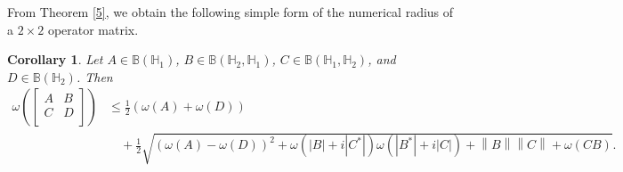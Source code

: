 \documentclass[12pt,twoside,reqno]{amsart}
\newtheorem{corollary}{Corollary}[section]
\numberwithin{equation}{section}
\begin{document}
From Theorem \ref{5}, we obtain the following simple form of the numerical radius of a $2\times 2$ operator matrix.
\begin{corollary}\label{Cor_1}
Let $A\in \mathbb B\left( {{\mathbb H}_{1}} \right)$, $B\in \mathbb B\left( {{\mathbb H}_{2}},{{\mathbb H}_{1}} \right)$, $C\in \mathbb B\left( {{\mathbb H}_{1}},{{\mathbb H}_{2}} \right)$, and $D\in \mathbb B\left( {{\mathbb H}_{2}} \right)$. Then
\[\begin{aligned}
   \omega \left( \left[ \begin{matrix}
   A & B  \\
   C & D  \\
\end{matrix} \right] \right)&\le \frac{1}{2}\left( \omega \left( A \right)+\omega \left( D \right) \right) \\ 
 &\quad +\frac{1}{2}\sqrt{{{\left( \omega \left( A \right)-\omega \left( D \right) \right)}^{2}}+\omega \left( \left| B \right|+i\left| {{C}^{*}} \right| \right)\omega \left( \left| {{B}^{*}} \right|+i\left| C \right| \right)+\left\| B \right\|\left\| C \right\|+\omega \left( CB \right)}.  
\end{aligned}\]
\end{corollary}
\end{document}
